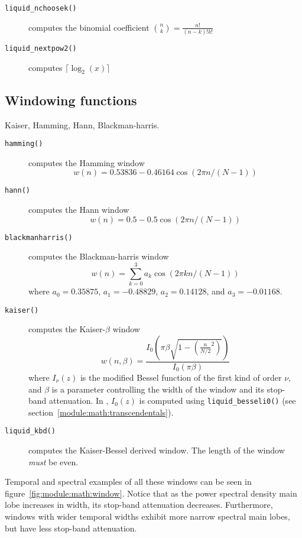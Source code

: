 \begin{description}
\item[{\tt liquid\_nchoosek()}]
    computes the binomial coefficient ${n \choose k} = \frac{n!}{(n-k)!k!}$

\item[{\tt liquid\_nextpow2()}]
    computes $\lceil \log_2(x) \rceil$

\end{description}

\subsection{Windowing functions}
Kaiser, Hamming, Hann, Blackman-harris.

\begin{description}
\item[{\tt hamming()}]
    computes the Hamming window
    \[
        w(n) = 0.53836 - 0.46164 \cos\left( 2 \pi n / (N-1) \right)
    \]
\item[{\tt hann()}]
    computes the Hann window
    \[
        w(n) = 0.5 - 0.5 \cos\left( 2 \pi n / (N-1) \right)
    \]
\item[{\tt blackmanharris()}]
    computes the Blackman-harris window
    \[
        w(n) = \sum_{k=0}^{3} { a_k \cos\left( 2 \pi k n / (N-1)\right) }
    \]
    where
    $a_0 =  0.35875$,
    $a_1 = -0.48829$,
    $a_2 =  0.14128$, and
    $a_3 = -0.01168$.
\item[{\tt kaiser()}]
    computes the Kaiser-$\beta$ window
    \[
        w(n,\beta) = \frac{
            I_0\left(\pi\beta\sqrt{1-\left(\frac{n}{N/2}^2\right)}\right)
        }{
            I_0\left(\pi\beta\right)
        }
    \]
    where $I_\nu(z)$ is the modified Bessel function of the first kind of
    order $\nu$, and $\beta$ is a parameter controlling the width of the
    window and its stop-band attenuation.
    In \liquid, $I_0(z)$ is computed using {\tt liquid\_besseli0()} (see
    section~\ref{module:math:transcendentals}).
\item[{\tt liquid\_kbd()}]
    computes the Kaiser-Bessel derived window.
    The length of the window {\em must} be even.
\end{description}

Temporal and spectral examples of all these windows can be seen in
figure~\ref{fig:module:math:window}.
Notice that as the power spectral density main lobe increases in width, its
stop-band attenuation decreases.
Furthermore, windows with wider temporal widths exhibit more narrow spectral
main lobes, but have less stop-band attenuation.

